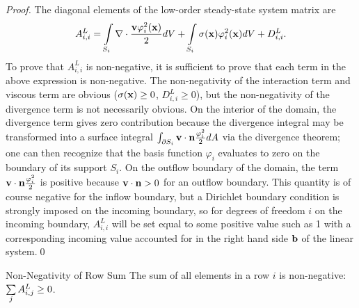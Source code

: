 \begin{proof}
The diagonal elements  of the low-order steady-state system matrix are
\[
A^L_{i,i} = \int\limits_{S_{i}}\nabla\cdot
   \frac{\mathbf{v}\varphi_i^2(\mathbf{x})}{2} dV
      + \int\limits_{S_{i}}\sigma(\mathbf{x})\varphi_i^2(\mathbf{x})dV
      + D_{i,i}^L.
\]
To prove that $A^L_{i,i}$ is non-negative, it is sufficient to prove that
each term in the above expression is non-negative. The non-negativity of
the interaction term and viscous term are obvious ($\sigma(\mathbf{x}) \ge 0$,
$D_{i,i}^L\geq 0$), but
the non-negativity of the divergence term is not necessarily obvious. On the interior of
the domain, the divergence term gives zero contribution because the divergence integral may
be transformed into a surface integral $\int_{\partial S_{i}}
\mathbf{v}\cdot\mathbf{n}\frac{\varphi_i^2}{2} dA$
via the divergence theorem; one can then recognize that
the basis function $\varphi_i$ evaluates to zero on the boundary of its support $S_{i}$.
On the outflow boundary of the domain, the term $\mathbf{v}\cdot\mathbf{n}
\frac{\varphi_i^2}{2}$ is positive because $\mathbf{v}\cdot\mathbf{n} >0$
for an outflow boundary. This quantity is of course negative for the inflow boundary,
but a Dirichlet boundary condition is strongly imposed on the incoming boundary, so
for degrees of freedom $i$ on the incoming boundary, $A^L_{i,i}$ will be set equal
to some positive value such as 1 with a corresponding incoming value
accounted for in the right hand side $\mathbf{b}$ of the linear system.\qed
\end{proof}
\begin{lemma}{Non-Negativity of Row Sum}
   The sum of all elements in a row $i$ is non-negative: $\sum\limits_j A^L_{i,j} \ge 0$.
\end{lemma}

